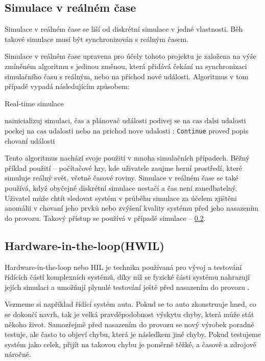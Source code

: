 \subsection{Simulace v reálném čase}
\label{subsec:real-time-sim}
Simulace v reálném čase se liší od diskrétní simulace v jedné vlastnosti. Běh takové simulace musí být synchronizován s reálným časem.

Simulace v reálném čase upravena pro účely tohoto projektu je založena na výše zmíněném algoritmu  s jedinou změnou, která přidává čekání na synchronizaci simulačního času s reálným, nebo na příchod nové události. Algoritmus v tom případě vypadá následujícím způsobem:

\begin{algorithm}
\caption{Real-time simulace}\label{real-time-alg}
\begin{algorithmic}[1]
\State $\text{nainicializuj simulaci, čas a plánovač události}$
\State $\text{podivej se na cas dalsi udalosti}$
\Return
\EndIf
\State $\text{pockej na cas udalosti nebo na prichod nove udalosti}$
:
   \State \texttt{Continue}
\EndIf
\State proveď popis chovaní události
\EndWhile
\end{algorithmic}
\end{algorithm}

Tento algoritmus nachází svoje použití v mnoha simulačních případech. Běžný příklad použití -- počítačové hry, kde uživatele zaujme herní prostředí, které simuluje reálný svět, včetně časové roviny. Simulace v reálném čase se také používá, když obyčejné diskrétní simulace nestačí a čas není zanedbatelný. Uživatel může chtít sledovat systém v průběhu simulace za účelem zjištěni anomálii v chovaní jeho prvků nebo zvýšení kvality systému před jeho nasazením do provozu. Takový přístup se používá v případě simulace  -- \ref{subsec:hwil}.

\subsection{Hardware-in-the-loop(HWIL)}
\label{subsec:hwil}

Hardware-in-the-loop nebo HIL je technika používaná pro vývoj a testování řídících částí komplexních systémů, díky níž se fyzické části systému nahrazují jejích simulaci a umožňují plynulé testování ještě před nasazením do provozu \cite{hil}.

Vezmeme si například řídící systém auta. Pokud se to auto zkonstruuje hned, co se dokončí navrh, tak je velká pravděpodobnost výskytu chyby, která může stát někoho život. Samozřejmě před nasazením do provozu se nový výrobek poradně testuje, ale často to objeví chybu, která je následkem jiné chyby. Pokud testujeme systém jako celek, přijít na takovou chybu je poměrně těžké, a časově a zdrojově náročné.

